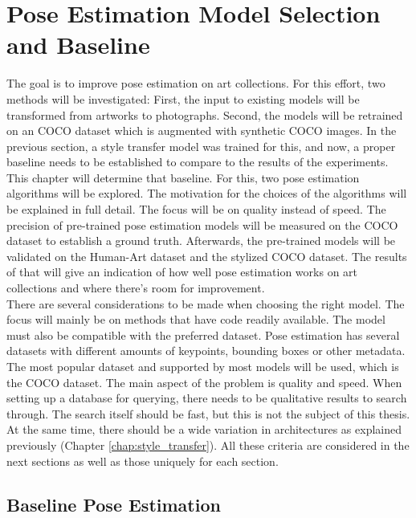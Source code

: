 \graphicspath{{images/chapter2/}}

\chapter{Pose Estimation Model Selection and Baseline}
\label{chap:baseline}

The goal is to improve pose estimation on art collections.
For this effort, two methods will be investigated: 
First, the input to existing models will be transformed from artworks to photographs.
Second, the models will be retrained on an COCO dataset which is augmented with synthetic COCO images.
In the previous section, a style transfer model was trained for this, and now, a proper baseline needs to be established to compare to the results of the experiments.
This chapter will determine that baseline.
For this, two pose estimation algorithms will be explored.
The motivation for the choices of the algorithms will be explained in full detail.
The focus will be on quality instead of speed.
The precision of pre-trained pose estimation models will be measured on the COCO dataset to establish a ground truth.
Afterwards, the pre-trained models will be validated on the Human-Art dataset and the stylized COCO dataset.
The results of that will give an indication of how well pose estimation works on art collections and where there's room for improvement.
\\

There are several considerations to be made when choosing the right model.
The focus will mainly be on methods that have code readily available.
The model must also be compatible with the preferred dataset.
Pose estimation has several datasets with different amounts of keypoints, bounding boxes or other metadata.
The most popular dataset and supported by most models will be used, which is the COCO dataset.
The main aspect of the problem is quality and speed.
When setting up a database for querying, there needs to be qualitative results to search through.
The search itself should be fast, but this is not the subject of this thesis.
At the same time, there should be a wide variation in architectures as explained previously (Chapter \ref{chap:style_transfer}).
All these criteria are considered in the next sections as well as those uniquely for each section.

\section{Baseline Pose Estimation}

